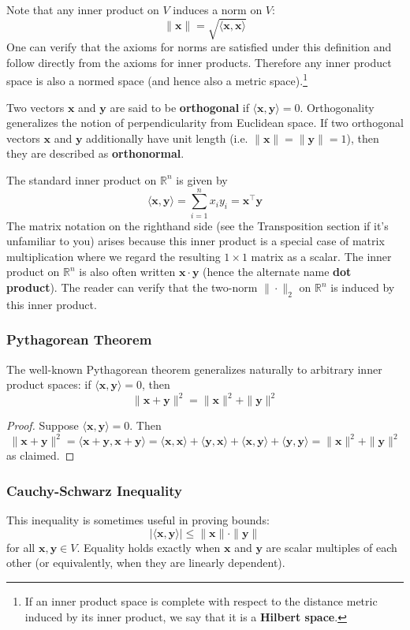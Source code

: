 \documentclass{article}
\newcommand{\R}{\mathbb{R}}
\renewcommand{\vec}[1]{\mathbf{#1}}
\newcommand{\tran}{^\top}
\newcommand{\inner}[2]{\langle #1, #2 \rangle}
\newcommand{\term}[1]{\textbf{#1}}
\begin{document}
Note that any inner product on $V$ induces a norm on $V$:
\[\|\vec{x}\| = \sqrt{\inner{\vec{x}}{\vec{x}}}\]
One can verify that the axioms for norms are satisfied under this definition and follow directly from the axioms for inner products. Therefore any inner product space is also a normed space (and hence also a metric space).\footnote{If an inner product space is complete with respect to the distance metric induced by its inner product, we say that it is a \term{Hilbert space}.}

Two vectors $\vec{x}$ and $\vec{y}$ are said to be \term{orthogonal} if $\inner{\vec{x}}{\vec{y}} = 0$. Orthogonality generalizes the notion of perpendicularity from Euclidean space. If two orthogonal vectors $\vec{x}$ and $\vec{y}$ additionally have unit length (i.e. $\|\vec{x}\| = \|\vec{y}\| = 1$), then they are described as \term{orthonormal}.

The standard inner product on $\R^n$ is given by
\[\inner{\vec{x}}{\vec{y}} = \sum_{i=1}^n x_iy_i = \vec{x}\tran\vec{y}\]
The matrix notation on the righthand side (see the Transposition section if it's unfamiliar to you) arises because this inner product is a special case of matrix multiplication where we regard the resulting $1 \times 1$ matrix as a scalar. The inner product on $\R^n$ is also often written $\vec{x}\cdot\vec{y}$ (hence the alternate name \term{dot product}). The reader can verify that the two-norm $\|\cdot\|_2$ on $\R^n$ is induced by this inner product.

\subsubsection{Pythagorean Theorem}
The well-known Pythagorean theorem generalizes naturally to arbitrary inner product spaces: if $\inner{\vec{x}}{\vec{y}} = 0$, then
\[\|\vec{x}+\vec{y}\|^2 = \|\vec{x}\|^2 + \|\vec{y}\|^2\]
\begin{proof}
Suppose $\inner{\vec{x}}{\vec{y}} = 0$. Then
\[\|\vec{x}+\vec{y}\|^2 = \inner{\vec{x}+\vec{y}}{\vec{x}+\vec{y}} = \inner{\vec{x}}{\vec{x}} + \inner{\vec{y}}{\vec{x}} + \inner{\vec{x}}{\vec{y}} + \inner{\vec{y}}{\vec{y}} = \|\vec{x}\|^2 + \|\vec{y}\|^2\]
as claimed.
\end{proof}

\subsubsection{Cauchy-Schwarz Inequality}
This inequality is sometimes useful in proving bounds:
\[|\inner{\vec{x}}{\vec{y}}| \leq \|\vec{x}\| \cdot \|\vec{y}\|\]
for all $\vec{x}, \vec{y} \in V$. Equality holds exactly when $\vec{x}$ and $\vec{y}$ are scalar multiples of each other (or equivalently, when they are linearly dependent).
\end{document}
